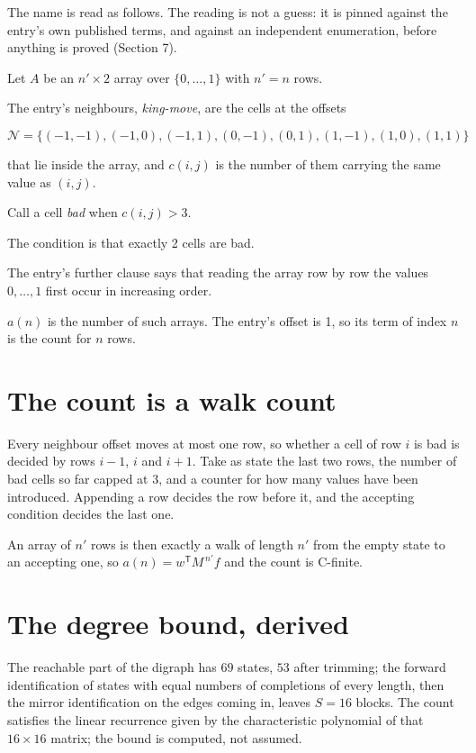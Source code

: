 \documentclass[11pt]{article}
\theoremstyle{definition}
\begin{document}
The name is read as follows. The reading is not a guess: it is pinned against the entry's own published terms, and against an independent enumeration, before anything is proved (Section 7).

Let $A$ be an $n' \times 2$ array over $\{0,\dots,1\}$ with $n' = n$ rows.

The entry's neighbours, {\itshape king-move}, are the cells at the offsets

\[\mathcal{N} = \{(-1,-1), (-1,0), (-1,1), (0,-1), (0,1), (1,-1), (1,0), (1,1)\}\]

that lie inside the array, and $c(i,j)$ is the number of them carrying the same value as $(i,j)$.

Call a cell {\itshape bad} when $c(i,j) > 3$.

The condition is that exactly 2 cells are bad.

The entry's further clause says that reading the array row by row the values $0,\dots,1$ first occur in increasing order.

$a(n)$ is the number of such arrays. The entry's offset is 1, so its term of index $n$ is the count for $n$ rows.

\section{The count is a walk count}

Every neighbour offset moves at most one row, so whether a cell of row $i$ is bad is decided by rows $i-1$, $i$ and $i+1$. Take as state the last two rows, the number of bad cells so far capped at 3, and a counter for how many values have been introduced. Appending a row decides the row before it, and the accepting condition decides the last one.

An array of $n'$ rows is then exactly a walk of length $n'$ from the empty state to an accepting one, so $a(n) = w^{\mathsf T}M^{\,n'}f$ and the count is C-finite.

\section{The degree bound, derived}

The reachable part of the digraph has $69$ states, $53$ after trimming; the forward identification of states with equal numbers of completions of every length, then the mirror identification on the edges coming in, leaves $S = 16$ blocks. The count satisfies the linear recurrence given by the characteristic polynomial of that $16\times16$ matrix; the bound is computed, not assumed.
\end{document}
